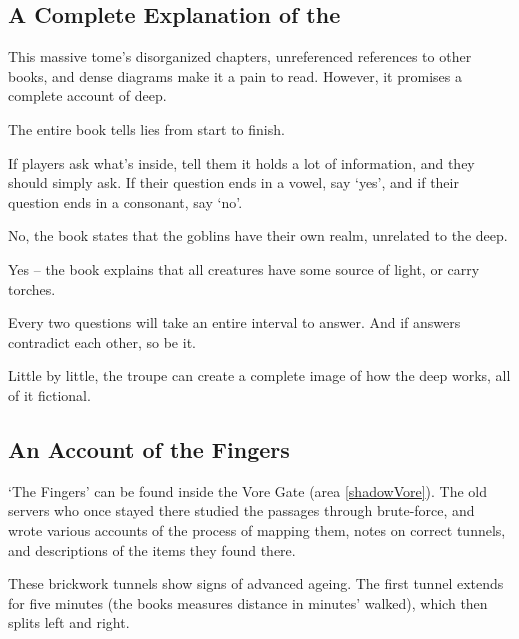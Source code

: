 \begin{multicols}{2}

\subsection{A Complete Explanation of the }
\label{bookOfDeep}

This massive tome's disorganized chapters, unreferenced references to other books, and dense diagrams make it a pain to read.
However, it promises a complete account of \gls{deep}.

The entire book tells lies from start to finish.

If players ask what's inside, tell them it holds a lot of information, and they should simply ask.
If their question ends in a vowel, say `yes', and if their question ends in a consonant, say `no'.

\begin{description}
  \itshape
  \item[Do goblins live in the \gls{deep}?]
  No, the book states that the goblins have their own realm, unrelated to the \gls{deep}.
  \item[Do the creatures down there just carry lights all the time?]
  Yes -- the book explains that all creatures have some source of light, or carry torches.
\end{description}

Every two questions will take an entire \gls{interval} to answer.
And if answers contradict each other, so be it.

Little by little, the troupe can create a complete image of how the \gls{deep} works, all of it fictional.

\subsection{An Account of the Fingers}
\label{bookOfFingers}

`The Fingers' can be found inside the Vore Gate (area \vref{shadowVore}).
The old \glspl{server} who once stayed there studied the passages through brute-force, and wrote various accounts of the process of mapping them, notes on correct tunnels, and descriptions of the items they found there.

\begin{exampletext}
  These brickwork tunnels show signs of advanced ageing.
  The first tunnel extends for five minutes (the books measures distance in minutes' walked), which then splits left and right.


\end{exampletext}
\end{multicols}
